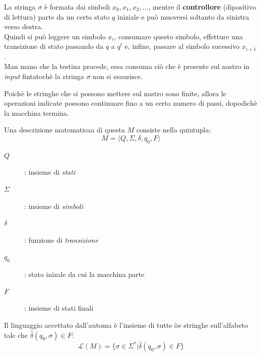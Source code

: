 \documentclass[12pt, a4paper, oneside]{book}
\begin{document}

  La stringa $\sigma$ è formata dai simboli $x_0, x_1, x_2, \dots$, mentre il \textbf{controllore} (dipositivo di lettura) parte da un certo stato $q$ iniziale e può muoversi soltanto da sinistra verso destra. \\[0.2ex]
  Quindi si può leggere un simbolo $x_i$, consumare questo simbolo, effetture una transizione di stato passando da $q$ a $q^t$ e, infine, passare al simbolo sucessivo $x_{i+1}$. \\[0.2ex]
  Man mano che la testina procede, essa consuma ciò che è presente sul nastro in \textit{input} fintatochè la stringa $\sigma$ non si esaurisce.

  Poichè le stringhe che si possono mettere sul nastro sono finite, allora le operazioni indicate possono continuare fino a un certo numero di passi, dopodichè la macchina termina.

  Una descrizione matematicaa di questa $M$ consiste nella quintupla:
  \begin{equation*}
    M = \langle Q, \Sigma, \delta, q_0, F\rangle
  \end{equation*}

  \begin{description}
    \item [$Q$]: insieme di \textit{stati}
    \item [$\Sigma$]: insieme di \textit{simboli}
    \item [$\delta$]: funzione di \textit{transizione} 
    \item [$q_0$]: stato inizale da cui la macchina parte
    \item [$F$]: insieme di stati finali
  \end{description}


  Il linguaggio accettato dall'automa è l'insieme di tutte òe stringhe sull'alfabeto tale che $\hat{\delta}(q_0, \sigma) \in F$:
  \begin{equation*}
    \mathcal{L}(M) = \{\sigma \in \Sigma^* | \hat{\delta}(q_0, \sigma) \in F\}
  \end{equation*}
\end{document}
